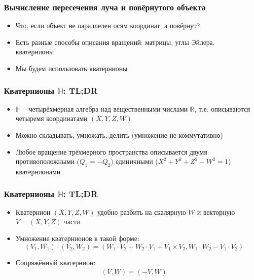 \documentclass[10pt,handout]{beamer}
\begin{document}
\begin{frame}
\frametitle{Вычисление пересечения луча и повёрнутого объекта}
\begin{itemize}
\item Что, если объект не параллелен осям координат, а повёрнут?
\pause
\item Есть разные способы описания вращений: матрицы, углы Эйлера, кватернионы
\pause
\item Мы будем использовать кватернионы
\end{itemize}
\end{frame}

\begin{frame}
\frametitle{Кватернионы \begin{math}\mathbb{H}\end{math}: TL;DR}
\begin{itemize}
\item \begin{math}\mathbb{H}\end{math} -- четырёхмерная алгебра над вещественными числами \begin{math}\mathbb{R}\end{math}, т.е. описываются четыремя координатами \begin{math}(X,Y,Z,W)\end{math}
\pause
\item Можно складывать, умножать, делить (умножение не коммутативно)
\pause
\item Любое вращение трёхмерного пространства описывается двумя противоположными (\begin{math}Q_1 = -Q_2\end{math}) единичными (\begin{math}X^2+Y^2+Z^2+W^2=1\end{math}) кватернионами
\end{itemize}
\end{frame}

\begin{frame}
\frametitle{Кватернионы \begin{math}\mathbb{H}\end{math}: TL;DR}
\begin{itemize}
\item Кватернион \begin{math}(X,Y,Z,W)\end{math} удобно разбить на скалярную \begin{math}W\end{math} и векторную \begin{math}V = (X, Y, Z)\end{math} части
\pause
\item Умножение кватернионов в такой форме:
\begin{equation}
(V_1,W_1)\cdot(V_2,W_2) = (W_1\cdot V_2 + W_2\cdot V_1 + V_1\times V_2, W_1\cdot W_2 - V_1\cdot V_2)
\end{equation}
\pause
\item Сопряжённый кватернион:
\begin{equation}
\overline{(V,W)} = (-V, W)
\end{equation}
\end{itemize}
\end{frame}
\end{document}

